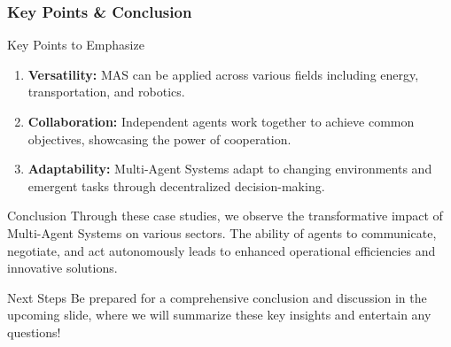 \documentclass[aspectratio=169]{beamer}
\begin{document}
\begin{frame}[fragile]
    \frametitle{Key Points & Conclusion}

    \begin{block}{Key Points to Emphasize}
        \begin{enumerate}
            \item \textbf{Versatility:} MAS can be applied across various fields including energy, transportation, and robotics.
            \item \textbf{Collaboration:} Independent agents work together to achieve common objectives, showcasing the power of cooperation.
            \item \textbf{Adaptability:} Multi-Agent Systems adapt to changing environments and emergent tasks through decentralized decision-making.
        \end{enumerate}
    \end{block}

    \begin{block}{Conclusion}
        Through these case studies, we observe the transformative impact of Multi-Agent Systems on various sectors. The ability of agents to communicate, negotiate, and act autonomously leads to enhanced operational efficiencies and innovative solutions.
    \end{block}
    
    \begin{block}{Next Steps}
        Be prepared for a comprehensive conclusion and discussion in the upcoming slide, where we will summarize these key insights and entertain any questions!
    \end{block}
\end{frame}
\end{document}
